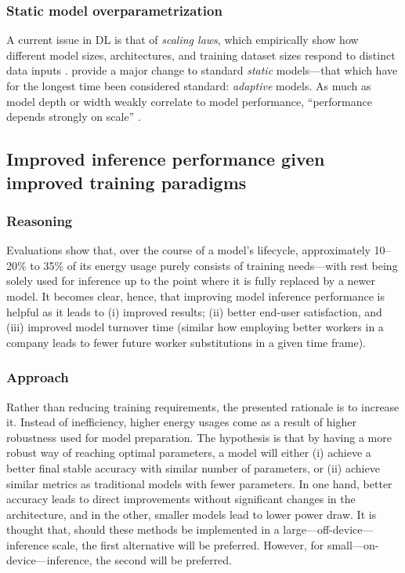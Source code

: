 \documentclass[conference]{IEEEtran}
\begin{document}
\subsubsection{Static model overparametrization}
A current issue in DL is that of \textit{scaling laws}, which empirically show how different model sizes, architectures, and training dataset sizes respond to distinct data inputs \cite{scaling_laws2020}. \cite{adaptive_model2024} provide a major change to standard \textit{static} models---that which have for the longest time been considered standard: \textit{adaptive} models. As much as model depth or width weakly correlate to model performance, ``performance depends strongly on scale'' \cite{scaling_laws2020}.

\subsection{Improved inference performance given improved training paradigms}

\subsubsection{Reasoning}
Evaluations show that, over the course of a model's lifecycle, approximately 10--20\% \cite{douwes2024} to 35\% \cite{sustainableAI2022} of its energy usage purely consists of training needs---with rest being solely used for inference up to the point where it is fully replaced by a newer model. It becomes clear, hence, that improving model inference performance is helpful as it leads to (i) improved results; (ii) better end-user satisfaction, and (iii) improved model turnover time (similar how employing better workers in a company leads to fewer future worker substitutions in a given time frame).

\subsubsection{Approach}
Rather than reducing training requirements, the presented rationale is to increase it. Instead of inefficiency, higher energy usages come as a result of higher robustness used for model preparation. The hypothesis is that by having a more robust way of reaching optimal parameters, a model will either (i) achieve a better final stable accuracy with similar number of parameters, or (ii) achieve similar metrics as traditional models with fewer parameters. In one hand, better accuracy leads to direct improvements without significant changes in the architecture, and in the other, smaller models lead to lower power draw. It is thought that, should these methods be implemented in a large---off-device---inference scale, the first alternative will be preferred. However, for small---on-device---inference, the second will be preferred.
\end{document}
